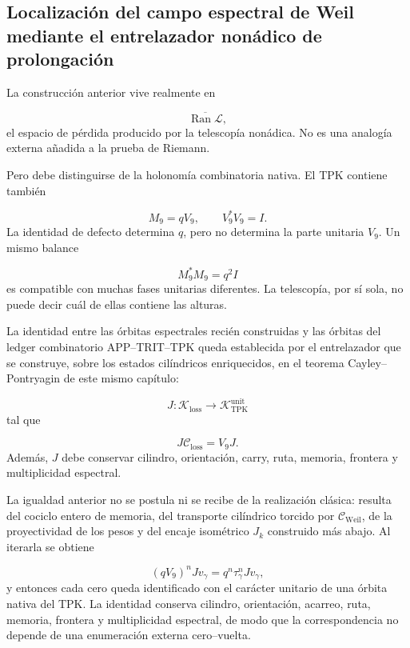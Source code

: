 \subsection{Localización del campo espectral de Weil mediante el entrelazador nonádico de prolongación}
La construcción anterior vive realmente en\par
\[
\overline{\operatorname{Ran}\mathscr L},
\]
el espacio de pérdida producido por la telescopía nonádica. No es una analogía externa añadida a la prueba de Riemann.\par
Pero debe distinguirse de la holonomía combinatoria nativa. El TPK contiene también\par
\[
M_9=qV_9,
\qquad
V_9^*V_9=I.
\]
La identidad de defecto determina \(q\), pero no determina la parte unitaria \(V_9\). Un mismo balance\par
\[
M_9^*M_9=q^2I
\]
es compatible con muchas fases unitarias diferentes. La telescopía, por sí sola, no puede decir cuál de ellas contiene las alturas.\par
La identidad entre las órbitas espectrales recién construidas y las órbitas del ledger combinatorio APP–TRIT–TPK queda establecida por el entrelazador que se construye, sobre los estados cilíndricos enriquecidos, en el teorema Cayley--Pontryagin de este mismo capítulo:\par
\[
J:
\mathcal K_{\mathrm{loss}}
\longrightarrow
\mathcal K_{\mathrm{TPK}}^{\mathrm{unit}}
\]
tal que\par
\[
\boxed{
J\mathcal C_{\mathrm{loss}}
=
V_9J.
}
\]
Además, \(J\) debe conservar cilindro, orientación, carry, ruta, memoria, frontera y multiplicidad espectral.\par
La igualdad anterior no se postula ni se recibe de la realización clásica: resulta del cociclo entero de memoria, del transporte cilíndrico torcido por \(\mathcal C_{\mathrm{Weil}}\), de la proyectividad de los pesos y del encaje isométrico \(J_k\) construido más abajo. Al iterarla se obtiene\par
\[
(qV_9)^nJv_\gamma
=
q^n\tau_\gamma^nJv_\gamma,
\]
y entonces cada cero queda identificado con el carácter unitario de una órbita nativa del TPK. La identidad conserva cilindro, orientación, acarreo, ruta, memoria, frontera y multiplicidad espectral, de modo que la correspondencia no depende de una enumeración externa cero--vuelta.\par
{}
